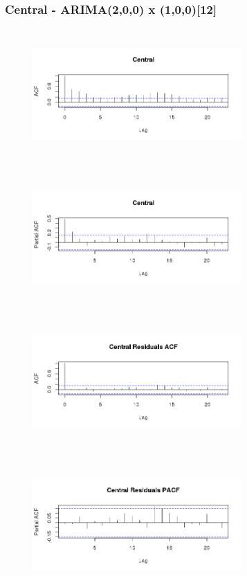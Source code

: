 \documentclass{article} %
\begin{document}
\subsubsection{Central - ARIMA(2,0,0) x (1,0,0)[12]}
 \begin{multicols}{2}
\begin{figure}[H]
\includegraphics[height=50mm, width=80mm]{Plots/Central_ACF.png}
\end{figure}
 
\begin{figure}[H]
\includegraphics[height=50mm, width=80mm]{Plots/Central_PACF.png}
\end{figure}
 
\begin{figure}[H]
\includegraphics[height=50mm, width=80mm]{Plots/Central_resid_ACF.png}
\end{figure}
 
\begin{figure}[H]
\includegraphics[height=50mm, width=80mm]{Plots/Central_resid_PACF.png}
\end{figure}
 \end{multicols}
\end{document}
